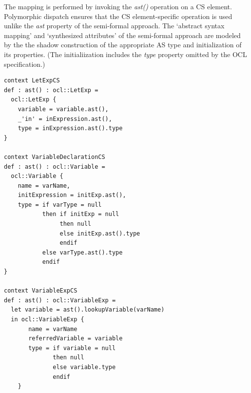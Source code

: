 \documentclass{llncs}
\begin{document}
The mapping is performed by invoking the \emph{ast()} operation on a CS element. Polymorphic dispatch ensures that the CS element-specific operation is used unlike the \emph{ast} property of the semi-formal approach. The `abstract syntax mapping' and `synthesized attributes' of the semi-formal approach are modeled by the the shadow construction of the appropriate AS type and initialization of its properties. (The initialiization includes the \emph{type} property omitted by the OCL specification.)

\begin{lstlisting}[caption=CS2AS description for let and variable expressions, label=lst:exampleCS2ASdescB, language=OCL]
context LetExpCS
def : ast() : ocl::LetExp = 
  ocl::LetExp {
    variable = variable.ast(),
    _'in' = inExpression.ast(),
    type = inExpression.ast().type
}

context VariableDeclarationCS
def : ast() : ocl::Variable = 
  ocl::Variable {
    name = varName,
    initExpression = initExp.ast(),
    type = if varType = null
           then if initExp = null
                then null
                else initExp.ast().type
                endif
           else varType.ast().type
           endif
}

context VariableExpCS
def : ast() : ocl::VariableExp =
  let variable = ast().lookupVariable(varName)
  in ocl::VariableExp {
       name = varName
       referredVariable = variable
       type = if variable = null
              then null
       	      else variable.type
       	      endif
   	}
\end{lstlisting}

\end{document}
